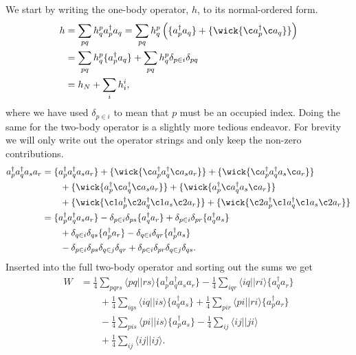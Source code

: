 \documentclass[
    a4paper, aps, twocolumn, floatfix, superscriptaddress,
    nofootinbib]{revtex4-1}
\newcommand{\1}{\mathds{1}}
\newcommand{\para}[1]{\left(#1\right)}
\newcommand{\bra}[1]{\langle #1\lvert}
\newcommand{\ket}[1]{\rvert #1\rangle}
\newcommand{\acr}[1]{a_{#1}^{\dagger}}
\newcommand{\ade}[1]{a_{#1}}
\begin{document}
    We start by writing the one-body operator, $h$, to its normal-ordered form.
    \begin{align}
        h &= \sum_{pq}h^p_q\acr{p}\ade{q}
        = \sum_{pq}h^p_q\para{
            \{\acr{p}\ade{q}\}
            + \{
                \wick{\c a_{p}^{\dagger} \c a_{q}}
            \}
        }
        \\
        &= \sum_{pq}h^p_q\{
            \acr{p}\ade{q}
        \}
        + \sum_{pq}h^p_q\delta_{p \in i}\delta_{pq}
        \\
        &= h_N + \sum_{i}h^i_i,
    \end{align}
    where we have used $\delta_{p \in i}$ to mean that $p$ must be an occupied
    index. Doing the same for the two-body operator is a slightly more tedious
    endeavor. For brevity we will only write out the operator strings and only
    keep the non-zero contributions.
    \begin{align}
        \acr{p}\acr{q}\ade{s}\ade{r}
        &=
        \{\acr{p}\acr{q}\ade{s}\ade{r}\}
        + \{
            \wick{\c a_p^{\dagger} a_{q}^{\dagger} \c a_{s} a_{r}}
        \}
        + \{
            \wick{\c a_p^{\dagger} a_{q}^{\dagger} a_{s} \c a_{r}}
        \}
        \nonumber \\
        &\qquad
        + \{
            \wick{a_p^{\dagger} \c a_{q}^{\dagger} \c a_{s} a_{r}}
        \}
        + \{
            \wick{a_p^{\dagger} \c a_{q}^{\dagger} a_{s} \c a_{r}}
        \}
        \nonumber \\
        &\qquad
        + \{
            \wick{\c1 a_p^{\dagger} \c2 a_{q}^{\dagger} \c1 a_{s} \c2 a_{r}}
        \}
        + \{
            \wick{\c2 a_p^{\dagger} \c1 a_{q}^{\dagger} \c1 a_{s} \c2 a_{r}}
        \}
        \\
        &=
        \{\acr{p}\acr{q}\ade{s}\ade{r}\}
        - \delta_{p \in i}\delta_{ps}\{\acr{q}\ade{r}\}
        + \delta_{p \in i}\delta_{pr}\{\acr{q}\ade{s}\}
        \nonumber \\
        &\qquad
        + \delta_{q \in i}\delta_{qs}\{\acr{p}\ade{r}\}
        - \delta_{q \in i}\delta_{qr}\{\acr{p}\ade{s}\}
        \nonumber \\
        &\qquad
        - \delta_{p \in i}\delta_{ps}\delta_{q \in j}\delta_{qr}
        + \delta_{p \in i}\delta_{pr}\delta_{q \in j}\delta_{qs}.
    \end{align}
    Inserted into the full two-body operator and sorting out the sums we get
    \begin{align}
        W
        &=
        \frac{1}{4}\sum_{pqrs}\bra{pq}\ket{rs}
        \{\acr{p}\acr{q}\ade{s}\ade{r}\}
        - \frac{1}{4}\sum_{iqr}\bra{iq}\ket{ri}\{\acr{q}\ade{r}\}
        \nonumber \\
        &\qquad
        + \frac{1}{4}\sum_{iqs}\bra{iq}\ket{is}\{\acr{q}\ade{s}\}
        + \frac{1}{4}\sum_{pir}\bra{pi}\ket{ri}\{\acr{p}\ade{r}\}
        \nonumber \\
        &\qquad
        - \frac{1}{4}\sum_{pis}\bra{pi}\ket{is}\{\acr{p}\ade{s}\}
        - \frac{1}{4}\sum_{ij}\bra{ij}\ket{ji}
        \nonumber \\
        &\qquad
        + \frac{1}{4}\sum_{ij}\bra{ij}\ket{ij}.
    \end{align}
\end{document}
